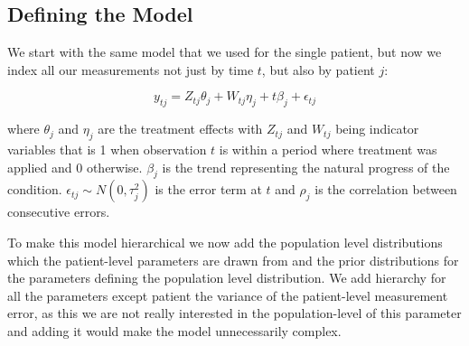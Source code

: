 \documentclass[12pt,a4paper,leqno]{report}
\theoremstyle{plain}
\theoremstyle{definition}
\theoremstyle{remark}
\begin{document}
\subsection{Defining the Model}\label{hiermodel}

We start with the same model that we used for the single patient, but now we index all our
measurements not just by time \(t\), but also by patient \(j\):

\begin{def}\label{hierarchicalmodel}
    \begin{equation}\label{}
        y_{tj} = Z_{tj}\theta_{j} + W_{tj}\eta_{j} + t\beta_{j} + \epsilon_{tj}
    \end{equation}
\end{def} where \(\theta_{j} \) and \(\eta_{j} \) are the treatment effects with \(Z_{tj}\) and \(W_{tj}\) being indicator
variables that is 1 when observation \(t\) is within a period where treatment was applied and
0 otherwise. \(\beta_j\) is the trend representing the natural progress of the
condition. \(\epsilon_{tj} \sim N(0,\tau_j^2) \) is the error term at \(t\) and
\(\rho_j\) is the correlation between consecutive errors.

To make this model hierarchical we now add the population level distributions which
the patient-level parameters are drawn from and the prior distributions for the
parameters defining the population level distribution. We add hierarchy for all the
parameters except patient the variance of the patient-level measurement error, as this
we are not really interested in the population-level of this parameter and adding it
would make the model unnecessarily complex.
\end{document}
